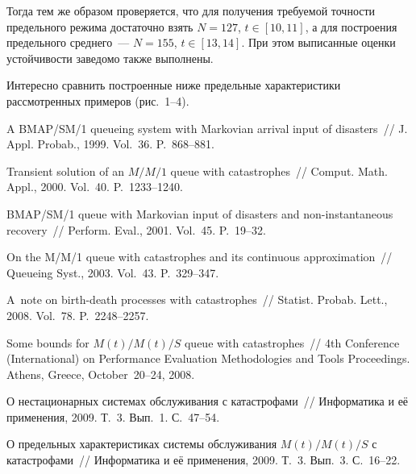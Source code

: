 \begin{multicols}{2}
Тогда тем же образом проверяется, что для получения требуемой точности предельного режима достаточно 
взять $N=127$, $t\in [10,11]$, а для построения предельного среднего~--- $N=155$, $t\in [13,14]$. 
При этом выписанные оценки устойчивости заведомо также выполнены.

Интересно сравнить построенные ниже предельные характеристики рассмотренных примеров
(рис.~1--4).


{\small\frenchspacing
{ %
\begin{thebibliography}{99}

A BMAP/SM/1 queueing system with Markovian arrival input of disasters~//
J. Appl. Probab., 1999. Vol.~36. P.~868--881.

Transient solution of an $M/M/1$ queue with catastrophes~// Comput. Math. Appl., 2000. Vol.~40. P.~1233--1240.

BMAP/SM/1 queue with Markovian input of disasters and non-instantaneous recovery~//
Perform. Eval., 2001. Vol.~45. P.~19--32.

On the M/M/1 queue with catastrophes and its continuous
approximation~// Queueing Syst., 2003. Vol.~43. P.~329--347.

A~note on birth-death processes with catastrophes~//  Statist.
Probab. Lett., 2008. Vol.~78.  P.~2248--2257.

Some bounds for $M(t)/M(t)/S$ queue with catastrophes~// 4th 
Conference (International) on Performance Evaluation Methodologies and Tools Proceedings.  Athens, Greece, October~20--24, 2008.

О нестационарных системах обслуживания с катастрофами~// Информатика и её применения, 2009. Т.~3. Вып.~1. С.~47--54.

О предельных характеристиках системы обслуживания $M(t)/M(t)/S$ с катастрофами~// 
Информатика и её применения, 2009. Т.~3. Вып.~3. С.~16--22.


\end{thebibliography}}}
\end{multicols}
